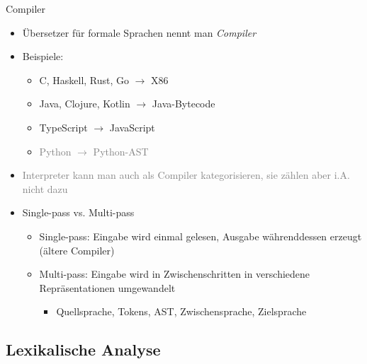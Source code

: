 \documentclass{beamer}
\begin{document}
\begin{frame}{Compiler}
	\begin{itemize}
		\item Übersetzer für formale Sprachen nennt man \emph{Compiler}
		\item Beispiele:
		\begin{itemize}
			\item C, Haskell, Rust, Go $\to$ X86
			\item Java, Clojure, Kotlin $\to$ Java-Bytecode
			\item TypeScript $\to$ JavaScript
			\item \textcolor{gray}{Python $\to$ Python-AST}
		\end{itemize}
		\pause
		\item \textcolor{gray}{Interpreter kann man auch als Compiler kategorisieren, sie zählen aber i.A. nicht dazu}
		\pause
		\item Single-pass vs. Multi-pass
		\begin{itemize}
			\item Single-pass: Eingabe wird einmal gelesen, Ausgabe währenddessen erzeugt (ältere Compiler)
			\item Multi-pass: Eingabe wird in Zwischenschritten in verschiedene Repräsentationen umgewandelt
			\begin{itemize}
				\item Quellsprache, Tokens, AST, Zwischensprache, Zielsprache
			\end{itemize}
		\end{itemize}
	\end{itemize}
\end{frame}

\subsection{Lexikalische Analyse}
\end{document}
